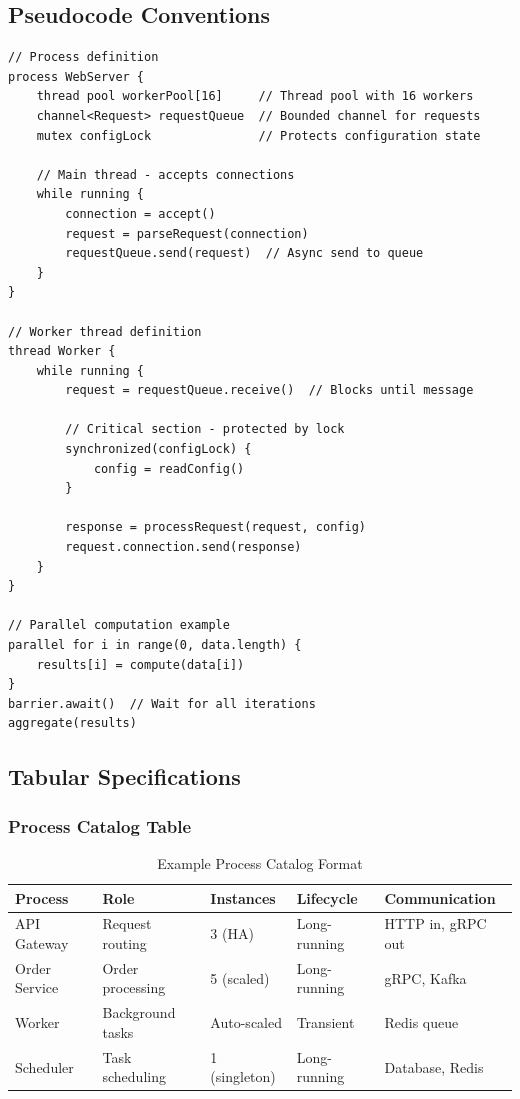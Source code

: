 \documentclass[11pt,letterpaper]{article}
\begin{document}
\subsection{Pseudocode Conventions}

\begin{verbatim}
// Process definition
process WebServer {
    thread pool workerPool[16]     // Thread pool with 16 workers
    channel<Request> requestQueue  // Bounded channel for requests
    mutex configLock               // Protects configuration state
    
    // Main thread - accepts connections
    while running {
        connection = accept()
        request = parseRequest(connection)
        requestQueue.send(request)  // Async send to queue
    }
}

// Worker thread definition
thread Worker {
    while running {
        request = requestQueue.receive()  // Blocks until message
        
        // Critical section - protected by lock
        synchronized(configLock) {
            config = readConfig()
        }
        
        response = processRequest(request, config)
        request.connection.send(response)
    }
}

// Parallel computation example
parallel for i in range(0, data.length) {
    results[i] = compute(data[i])
}
barrier.await()  // Wait for all iterations
aggregate(results)
\end{verbatim}

\subsection{Tabular Specifications}

\subsubsection{Process Catalog Table}

\begin{table}[H]
\centering
\caption{Example Process Catalog Format}
\small
\begin{tabular}{@{}L{2cm}L{2.5cm}L{2cm}L{2.5cm}L{3.5cm}@{}}
\toprule
\textbf{Process} & \textbf{Role} & \textbf{Instances} & \textbf{Lifecycle} & \textbf{Communication} \\
\midrule
API Gateway & Request routing & 3 (HA) & Long-running & HTTP in, gRPC out \\
Order Service & Order processing & 5 (scaled) & Long-running & gRPC, Kafka \\
Worker & Background tasks & Auto-scaled & Transient & Redis queue \\
Scheduler & Task scheduling & 1 (singleton) & Long-running & Database, Redis \\
\bottomrule
\end{tabular}
\end{table}
\end{document}
